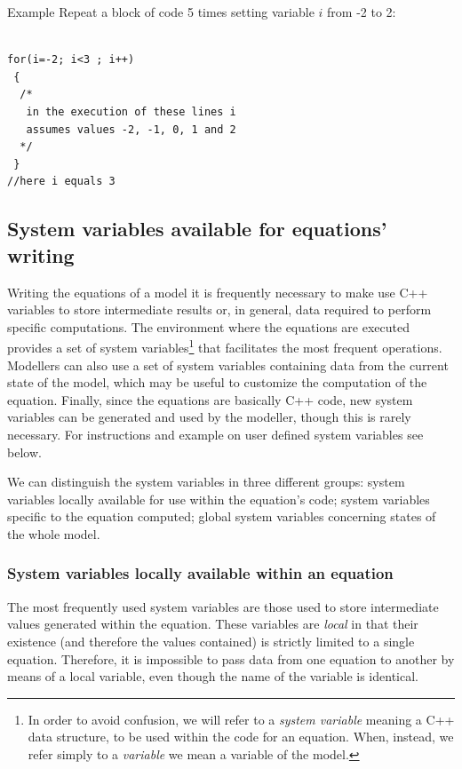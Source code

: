 \documentclass [11pt,a4paper] {book}
\begin{document}
Example Repeat a block of code 5 times setting variable $i$ from -2 to 2:

\small
\begin{verbatim}

for(i=-2; i<3 ; i++)
 {
  /*
   in the execution of these lines i
   assumes values -2, -1, 0, 1 and 2
  */
 }
//here i equals 3
\end{verbatim}
\normalsize




\subsection{System variables available for equations' writing}

Writing the equations of a model it is frequently necessary to make use C++ variables to store intermediate results or, in general, data required to perform specific computations. The environment where the equations are executed provides a set of system variables\footnote{In order to avoid confusion, we will refer to a \textit{system variable} meaning a C++ data structure, to be used within the code for an equation. When, instead, we refer simply to a \textit{variable} we mean a variable of the model.} that facilitates the most frequent operations. Modellers can also use a set of system variables containing data from the current state of the model, which may be useful to customize the computation of the equation. Finally, since the equations are basically C++ code, new system variables can be generated and used by the modeller, though this is rarely necessary. For instructions and example on user defined system variables see below.

We can distinguish the system variables in three different groups: system variables locally available for use within the equation's code; system variables specific to the equation computed; global system variables concerning states of the whole model.

\subsubsection{System variables locally available within an equation}

The most frequently used system variables are those used to store intermediate values generated within the equation. These variables are \textit{local} in that their existence (and therefore the values contained) is strictly limited to a single equation. Therefore, it is impossible to pass data from one equation to another by means of a local variable, even though the name of the variable is identical.
\end{document}
